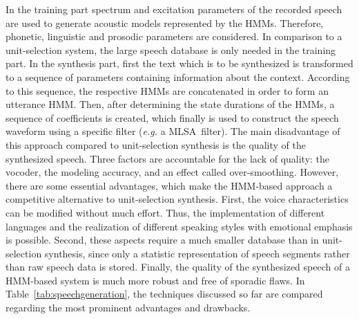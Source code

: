 \noindent In the training part spectrum and excitation parameters %
of the recorded speech are used to generate acoustic models represented by the \acp{HMM}. Therefore, phonetic, linguistic and prosodic parameters are considered. In comparison to a unit-selection system, the large speech database is only needed in the training part. In the synthesis part, first the text which is to be synthesized is transformed to a sequence of parameters containing information about the context. %
According to this sequence, the respective \acp{HMM} are concatenated in order to form an utterance \ac{HMM}. Then, after determining the state durations of the \acp{HMM}, a sequence of coefficients is created, which finally is used to construct the speech waveform using a specific filter (\textit{e.g.} a \ac{MLSA}~filter). The main disadvantage of this approach compared to unit-selection synthesis is the quality of the synthesized speech. Three factors are accountable for the lack of quality: the vocoder, the modeling accuracy, and an effect called over-smoothing. However, there are some essential advantages, which make the \ac{HMM}-based approach a competitive alternative to unit-selection synthesis. First, the voice characteristics can be modified without much effort. Thus, the implementation of different languages and the realization of different speaking styles with emotional emphasis is possible. Second, these aspects require a much smaller database than in unit-selection synthesis, since only a statistic representation of speech segments rather than raw speech data is stored. Finally, the quality of the synthesized speech of a \ac{HMM}-based system is much more robust and free of sporadic flaws. In Table~\ref{tab:speechgeneration}, the techniques discussed so far are compared regarding the most prominent advantages and drawbacks.


\begin{table}[h]
	\caption{Comparison of speech generation methods~\cite{hinterleitner:quality, black:statistical}}
	\label{tab:speechgeneration}
	\vspace{-0.75em}
		\vspace{-0.75em}
\end{table}
	
